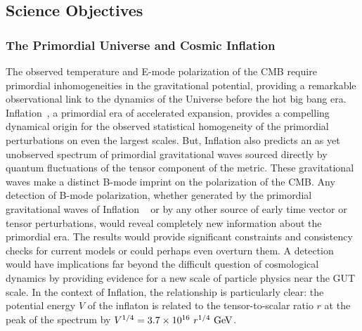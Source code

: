 
\subsection{Science Objectives}
\label{sec:science}

\vspace{-0.05in}
 
\subsubsection{The Primordial Universe and Cosmic Inflation}

\vspace{-0.05in}

The observed temperature and E-mode polarization of the \ac{CMB} require primordial inhomogeneities in the gravitational potential, providing a remarkable observational link to the dynamics of the Universe before the hot big bang era. Inflation~\cite{guth81,linde82,albrecht82,sato81,kolb94}, a primordial era of accelerated expansion, provides a compelling 
dynamical origin for the observed statistical homogeneity of the primordial perturbations on even the largest scales. But, Inflation also predicts an as yet unobserved spectrum of primordial gravitational waves sourced directly by 
quantum fluctuations of the tensor component of the metric. 
These gravitational waves make a distinct B-mode imprint on the polarization of the \ac{CMB}. 
Any detection of B-mode polarization, whether generated by the primordial gravitational waves of Inflation ~\cite{kamionkowski97a,zaldarriaga97} or by any other source of early time vector or tensor perturbations, would reveal completely new information about the primordial era. The results would provide significant constraints and consistency checks for current models or could perhaps even overturn them. A detection would have implications far beyond the difficult question of cosmological dynamics by providing evidence for a new scale of particle physics near the GUT scale. In the context of Inflation, the relationship is particularly clear: the potential energy $V$ of the inflaton is related to the tensor-to-scalar ratio $r$ at the peak of the spectrum by $V^{1/4} = 3.7 \times 10^{16} \ r^{1/4}\,\, {\rm GeV}$. 

